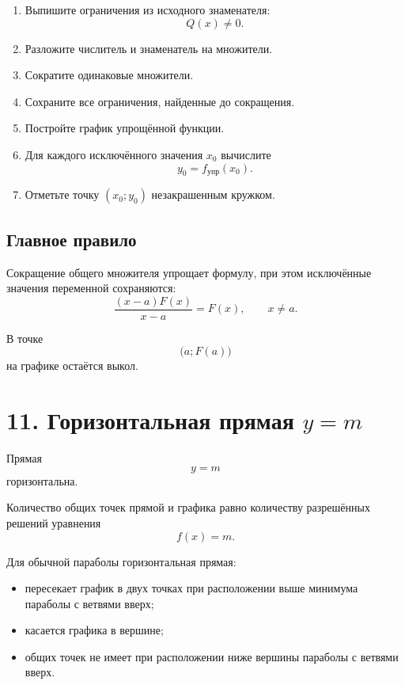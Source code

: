 \documentclass[a4paper,12pt]{article}
\begin{document}
\begin{enumerate}[label=\textcolor{darkaccent}{\textbf{\arabic*.}}]
  \item Выпишите ограничения из исходного знаменателя:
  \[
    Q(x)\ne 0.
  \]

  \item Разложите числитель и знаменатель на множители.

  \item Сократите одинаковые множители.

  \item Сохраните все ограничения, найденные до сокращения.

  \item Постройте график упрощённой функции.

  \item Для каждого исключённого значения \(x_0\) вычислите
  \[
    y_0=f_{\text{упр}}(x_0).
  \]

  \item Отметьте точку \((x_0;y_0)\) незакрашенным кружком.
\end{enumerate}

\subsection*{Главное правило}

Сокращение общего множителя упрощает формулу, при этом исключённые значения переменной сохраняются:
\[
  \frac{(x-a)F(x)}{x-a}=F(x),
  \qquad x\ne a.
\]

В точке
\[
  \bigl(a;F(a)\bigr)
\]
на графике остаётся выкол.

\section*{11. Горизонтальная прямая \(y=m\)}

Прямая
\[
  y=m
\]
горизонтальна.

Количество общих точек прямой и графика равно количеству разрешённых решений уравнения
\[
  f(x)=m.
\]

Для обычной параболы горизонтальная прямая:

\begin{itemize}
  \item пересекает график в двух точках при расположении выше минимума параболы с ветвями вверх;
  \item касается графика в вершине;
  \item общих точек не имеет при расположении ниже вершины параболы с ветвями вверх.
\end{itemize}
\end{document}
